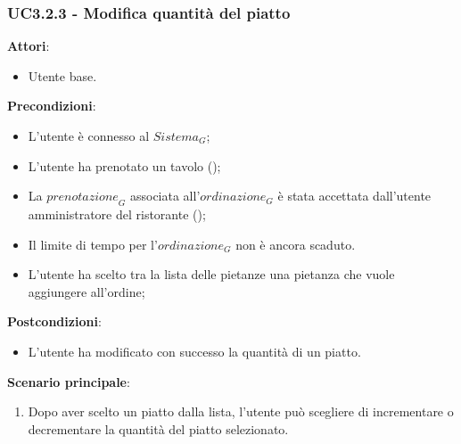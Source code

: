 \subsubsection{UC3.2.3 - Modifica quantità del piatto
}\label{usecase:3_2_3}
\textbf{Attori}:
\begin{itemize}
    \item Utente base.
\end{itemize}
\textbf{Precondizioni}:
\begin{itemize}
    \item L'utente è connesso al $\textit{Sistema}_G$; 
    \item L'utente ha prenotato un tavolo ();
    \item La $\textit{prenotazione}_G$ associata all'$\textit{ordinazione}_G$ è stata accettata dall'utente amministratore del ristorante ();
    \item Il limite di tempo per l'$\textit{ordinazione}_G$ non è ancora scaduto.
    \item L'utente ha scelto tra la lista delle pietanze una pietanza che vuole aggiungere all'ordine;
\end{itemize}
\textbf{Postcondizioni}:
\begin{itemize}
    \item L'utente ha modificato con successo la quantità di un piatto.
\end{itemize}
\textbf{Scenario principale}:
\begin{enumerate}
    \item Dopo aver scelto un piatto dalla lista, l'utente può scegliere di incrementare o decrementare la quantità del piatto selezionato.
\end{enumerate}

